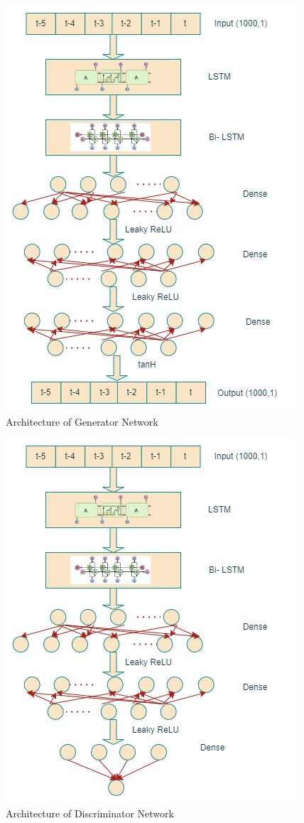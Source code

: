 \documentclass[letterpaper]{article}
\begin{document}
\begin{figure}
\centerline{\includegraphics[scale=.4]{Generator.png}}
\caption{Architecture of Generator Network}
\label{fig}
\end{figure}

\begin{figure}
\centerline{\includegraphics[scale=.4]{Discriminator.png}}
\caption{Architecture of Discriminator Network}
\label{fig}
\end{figure}
\end{document}
